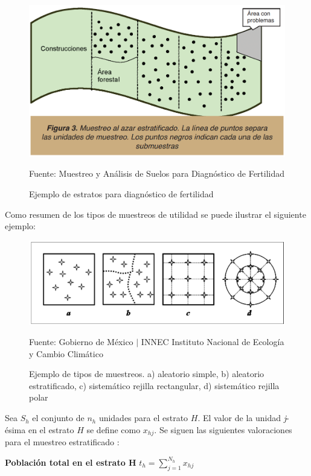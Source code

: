 \begin{figure}[H]
    \centering
    \includegraphics[width=0.3\paperwidth]{ref/stratified-sampling-examples.png}
    \caption{Ejemplo de estratos para diagnóstico de fertilidad}
    Fuente: Muestreo y Análisis de Suelos para Diagnóstico de Fertilidad \cite{lassaga-2011}
\end{figure}

Como resumen de los tipos de muestreos de utilidad se puede ilustrar el siguiente ejemplo:

\begin{figure}[H]
    \centering
    \includegraphics[width=0.3\paperwidth]{ref/kind-of-samplings-example.png}
    \caption{Ejemplo de tipos de muestreos. a) aleatorio simple, b) aleatorio estratificado, c) sistemático rejilla rectangular, d) sistemático rejilla polar}
    Fuente: Gobierno de México $\mid$ INNEC Instituto Nacional de Ecología y Cambio Climático \cite{innec-2007}
\end{figure}

Sea $S_h$ el conjunto de $n_h$ unidades para el estrato $H$. El valor de la unidad \textit{j}-ésima en el estrato $H$ se define como $x_{hj}$. Se siguen las siguientes valoraciones para el muestreo estratificado \cite{lohr-2009}:

\bigbreak

\textbf{Población total en el estrato H}
\bigbreak
$t_h = \sum \limits_{j=1}^{N_h} x_{hj}$


